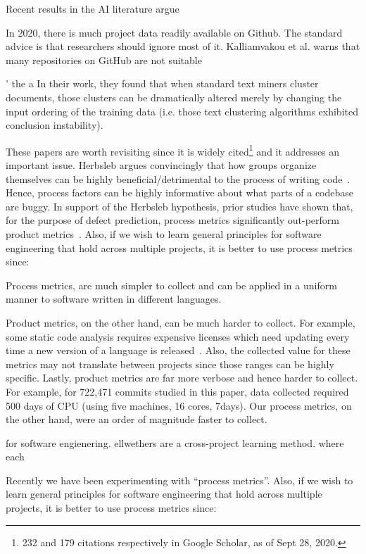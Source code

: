 Recent results in the AI literature argue


In 2020, there is much project data readily available on Github. The standard advice is that researchers should ignore most of it.
Kalliamvakou et al. warns that  many repositories on GitHub are not suitable

'
the a
 In their work, they found that when standard text miners cluster documents, those clusters can be dramatically altered merely by changing the input ordering of the training data (i.e. those text clustering algorithms
 exhibited conclusion instability).
 
 These papers are worth revisiting since it is widely cited\footnote{232 and 179 citations respectively in Google Scholar, as of Sept 28, 2020.} and it addresses an important issue. Herbsleb argues convincingly that how groups organize themselves
can be highly beneficial/detrimental to the process of writing code~\cite{Herbsleb14}. Hence, process factors
can be highly informative about what parts of a codebase are buggy. In support
of the Herbsleb hypothesis, prior studies have shown that, for the purpose of defect prediction,
process metrics significantly out-perform product metrics~\cite{Lumpe12,Ra13,bird2009does}. 
Also, if we wish to learn general principles for software engineering that hold across multiple projects, it is better to use process metrics since:
\bi
\item
Process metrics, are much simpler to collect and can be applied in a uniform manner to software written in different languages.  
\item
Product metrics, on the other hand,  can be much harder to collect.
For example, some  static code analysis requires expensive licenses which need updating every time a new version of a language is released~\cite{Devanbu14}.
Also, the collected value for these metrics may not translate between projects since those ranges can be highly specific.
Lastly,
product metrics are far more verbose and hence harder to collect. For example, 
for 722,471 commits studied in this paper, 
data collected required 500 days of CPU (using five machines, 16 cores, 7days). Our process metrics, on the other hand,
were an order of magnitude faster to collect.


for software engienering. ellwethers are a cross-project  learning method. where each

Recently we have been experimenting with ``process metrics''.
Also, if we wish to learn general principles for software engineering that hold across multiple projects, it is better to use process metrics since:
 
